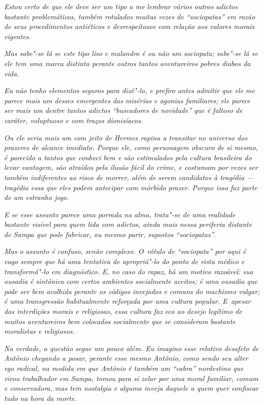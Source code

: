 \emph{Estou certo de que ele deve ser um tipo a me lembrar vários outros
adictos bastante problemáticos, também rotulados muitas vezes de
``sociopatas'' em razão de seus procedimentos antiéticos e
desrespeitosos com relação aos valores morais vigentes.}~

\emph{Mas sabe"-se lá se este tipo liso e malandro é ou não um sociopata;
sabe"-se lá se ele tem uma marca distinta perante outros tantos
aventureiros pobres diabos da vida.}~

\emph{Eu não tenho elementos seguros para dizê"-lo, e prefiro antes
admitir que ele me parece mais um desses emergentes das misérias e
agonias familiares; ele parece ser mais um dentre tantos adictos
``buscadores de novidade'' que é faltoso de caráter, voluptuoso e com
traços dionisíacos.}~

\emph{Ou ele seria mais um com jeito de Hermes rapina a transitar no
universo dos prazeres de alcance imediato. Porque ele, como personagem
obscuro de si mesmo, é parecido a tantos que conheci bem e são
estimulados pela cultura brasileira do levar vantagem, são atraídos pela
ilusão fácil do crime, e costumam por vezes ser também indiferentes ao
risco de morrer, além de serem candidatos à tragédia --- tragédia essa
que eles podem antecipar com mórbido prazer. Porque isso faz parte de um
estranho jogo.}

\emph{E se esse assunto parece uma porrada na alma, trata"-se de uma
realidade bastante visível para quem lida com adictos, ainda mais nessa
periferia distante de Sampa que pode fabricar, ou mesmo parir, supostos
``sociopatas''.}~

\emph{Mas o assunto é confuso, senão complexo. O~rótulo de ``sociopata''
por aqui é vago sempre que há uma tentativa de apropriá"-lo do ponto de
vista médico e transformá"-lo em diagnóstico. E, no caso do rapaz, há um
motivo razoável: sua ousadia é sintônica com certos ambientes
socialmente aceitos; é uma ousadia que pode ser bem acolhida perante os
códigos invejados e comuns do machismo vulgar; é uma transgressão
habitualmente reforçada por uma cultura popular. E~apesar das
interdições morais e religiosas, essa cultura faz eco ao desejo legítimo
de muitos aventureiros bem colocados socialmente que se consideram
bastante moralistas e religiosos.}~

\emph{Na verdade, a questão segue um pouco além. Eu imagino esse
relativo desafeto de Antônio chegando a posar, perante esse mesmo
Antônio, como sendo seu alter ego radical, na medida em que Antônio é
também um ``cabra'' nordestino que virou trabalhador em Sampa, tomou
para si zelar por uma moral familiar, comum e conservadora, mas tem
nostalgia e alguma inveja daquele a quem quer confiscar tudo na hora da
morte.}~

